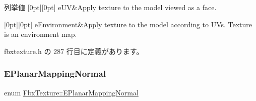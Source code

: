 \begin{DoxyEnumFields}{列挙値}
[0pt][0pt]{}\mbox{\label{class_fbx_texture_afdf9b65a25dfe5bdcef820f0fc1f5b34ae85f5d7fb0b2aaa8576103e7b39e4710}} 
e\+UV&Apply texture to the model viewed as a face. \\
\hline

[0pt][0pt]{}\mbox{\label{class_fbx_texture_afdf9b65a25dfe5bdcef820f0fc1f5b34a1cf2846f54e7a977a8e290ae765528ca}} 
e\+Environment&Apply texture to the model according to U\+Vs. Texture is an environment map. \\
\hline

\end{DoxyEnumFields}


 fbxtexture.\+h の 287 行目に定義があります。

\mbox{\label{class_fbx_texture_a6115b6970e4c83198112530d1e6f578c}} 
\subsubsection{\texorpdfstring{E\+Planar\+Mapping\+Normal}{EPlanarMappingNormal}}
{\footnotesize\ttfamily enum \hyperlink{class_fbx_texture_a6115b6970e4c83198112530d1e6f578c}{Fbx\+Texture\+::\+E\+Planar\+Mapping\+Normal}}


